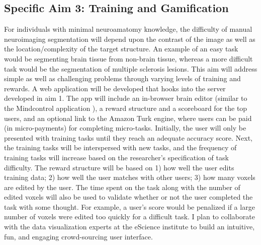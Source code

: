 

\subsection*{Specific Aim 3: Training and Gamification}

For individuals with minimal neuroamatomy knowledge, the difficulty of manual neuroimaging segmentation will depend upon the contrast of the image as well as the location/complexity of the target structure. An example of an easy task would be segmenting brain tissue from non-brain tissue, whereas a more difficult task would be the segmentation of multiple sclerosis lesions. This aim will address simple as well as challenging problems through varying levels of training and rewards. A web application will be developed that hooks into the server developed in aim 1. The app will include an in-browser brain editor (similar to the Mindcontrol application \cite{keshavan2016mindcontrol}), a reward structure and a scoreboard for the top users, and an optional link to the Amazon Turk engine, where users can be paid (in micro-payments) for completing micro-tasks. Initially, the user will only be presented with training tasks until they reach an adequate accuracy score. Next, the training tasks will be interspersed with new tasks, and the frequency of training tasks will increase based on the researcher's specification of task difficulty. The reward structure will be based on 1) how well the user edits training data; 2) how well the user matches with other users; 3) how many voxels are edited by the user. The time spent on the task along with the number of edited voxels will also be used to validate whether or not the user completed the task with some thought. For example, a user's score would be penalized if a large number of voxels were edited too quickly for a difficult task. I plan to collaborate with the data visualization experts at the eScience institute to build an intuitive, fun, and engaging crowd-sourcing user interface.